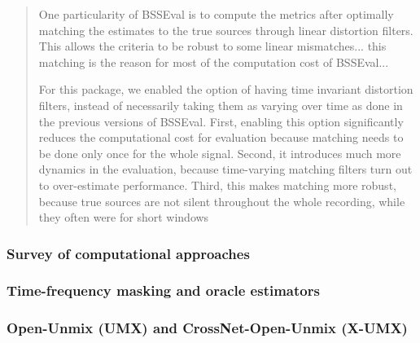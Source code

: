\documentclass[report.tex]{subfiles}
\begin{document}
\begin{quote}
	One particularity of BSSEval is to compute the metrics after optimally matching the estimates to the true sources through linear distortion filters. This allows the criteria to be robust to some linear mismatches... this matching is the reason for most of the computation cost of BSSEval...

	For this package, we enabled the option of having time invariant distortion filters, instead of necessarily taking them as varying over time as done in the previous versions of BSSEval. First, enabling this option significantly reduces the computational cost for evaluation because matching needs to be done only once for the whole signal. Second, it introduces much more dynamics in the evaluation, because time-varying matching filters turn out to over-estimate performance. Third, this makes matching more robust, because true sources are not silent throughout the whole recording, while they often were for short windows
\end{quote}

\subsubsection{Survey of computational approaches}



\subsubsection{Time-frequency masking and oracle estimators}



\subsubsection{Open-Unmix (UMX) and CrossNet-Open-Unmix (X-UMX)}
\end{document}
